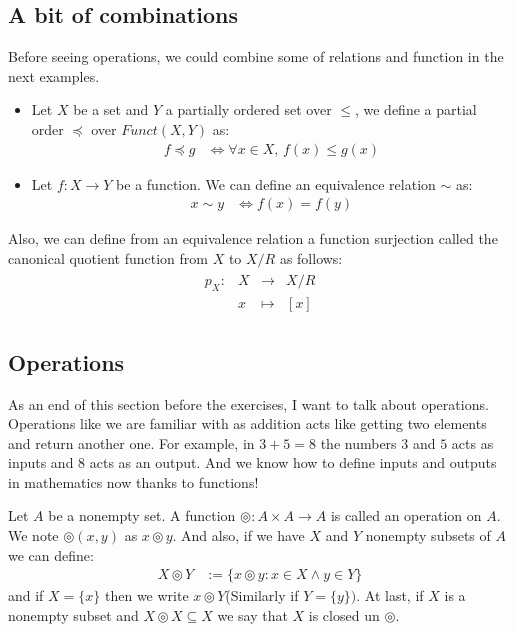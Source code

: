 \documentclass{tufte-handout}
\begin{document}
\subsection{A bit of combinations}
Before seeing operations, we could combine some of relations and function in the next examples.
\begin{itemize}
	\item Let $X$ be a set and $Y$ a partially ordered set over $\le$, we define a partial order $\preccurlyeq$ over $Funct(X, Y)$ as:
	\begin{align*}
		f \preccurlyeq g &\Longleftrightarrow \forall x \in X, \,f(x) \le g(x)
	\end{align*}

	\item Let $f: X \to Y$ be a function. We can define an equivalence relation $\sim$ as:
	\begin{align*}
		x \sim y &\Longleftrightarrow f(x) = f(y)
	\end{align*}
\end{itemize}
Also, we can define from an equivalence relation a function surjection called the canonical quotient function from $X$ to $X/R$ as follows:
\begin{align*}
	\begin{matrix}
		p_X: & X & \to & X/R\\
		& x &\mapsto & [x]
	\end{matrix}
\end{align*}

\subsection{Operations}
As an end of this section before the exercises, I want to talk about operations. Operations like we are familiar with as addition acts like getting two elements and return another one. For example, in $3 + 5 = 8$ the numbers $3$ and $5$ acts as inputs and $8$ acts as an output. And we know how to define inputs and outputs in mathematics now thanks to functions!

\begin{definition}[Operation]
	Let $A$ be a nonempty set. A function $\circledcirc: A \times A \to A$ is called an operation on $A$. We note $\circledcirc(x, y)$ as $x \circledcirc y$. And also, if we have $X$ and $Y$ nonempty subsets of $A$ we can define:
	\begin{align*}
		X \circledcirc Y &:= \{x \circledcirc y: x \in X \wedge y \in Y \}
	\end{align*}
	and if $X = \{x\}$ then we write $x \circledcirc Y$(Similarly if $Y = \{y\})$. At last, if $X$ is a nonempty subset and $X \circledcirc X \subseteq X$ we say that $X$ is closed un $\circledcirc$.
\end{definition}
\end{document}
